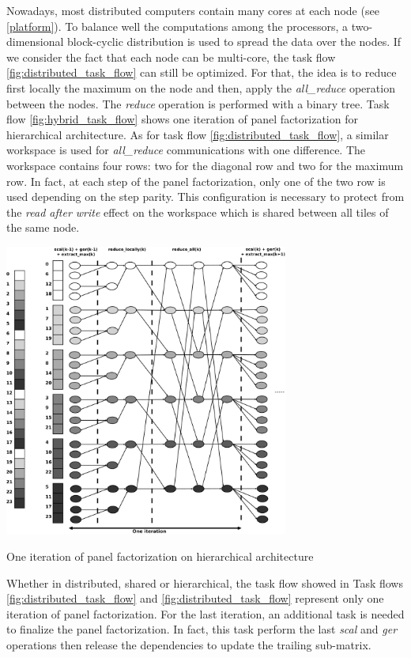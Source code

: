 Nowadays, most distributed computers contain many cores at each node (see \ref{platform}). To balance well the computations among the processors, a two-dimensional block-cyclic distribution is used to spread the data over the nodes\cite{DGW:SHPCC92}.
If we consider the fact that each node can be multi-core, the task flow \ref{fig:distributed_task_flow} can still be optimized. For that, the idea is to reduce first locally the maximum on the node and then, apply the \emph{all\_reduce} operation between the nodes. The \emph{reduce} operation is performed with a binary tree. Task flow \ref{fig:hybrid_task_flow} shows one iteration of panel factorization for hierarchical architecture. As for task flow \ref{fig:distributed_task_flow}, a similar workspace is used for \emph{all\_reduce} communications with one difference. The workspace contains four rows: two for the diagonal row and two for the maximum row. In fact, at each step of the panel factorization, only one of the two row is used depending on the step parity. This configuration is necessary to protect from the \emph{read after write} effect on the workspace  which is shared between all tiles of the same node.

\begin{taskflow}[!ht]
\centering
\includegraphics[width=0.7\textwidth]{figures/hybrid_tf_bw.pdf}
\caption{One iteration of panel factorization on hierarchical architecture \label{fig:hybrid_task_flow}}
\end{taskflow}
 
Whether in distributed, shared or hierarchical, the task flow showed in Task flows \ref{fig:distributed_task_flow} and \ref{fig:distributed_task_flow} represent only one iteration of panel factorization. For the last iteration, an additional task is needed to finalize the panel factorization. In fact, this task perform the last \emph{scal} and \emph{ger} operations then release the dependencies to update the trailing sub-matrix.

